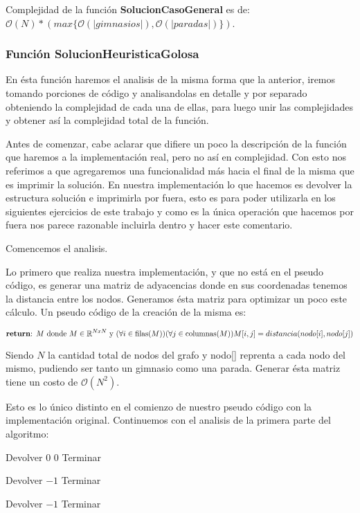 Complejidad de la función \textbf{SolucionCasoGeneral} es de: $\mathcal{O}(N) * (max\{\mathcal{O}(|gimnasios|), \mathcal{O}(|paradas|)\})$.


\subsubsection{Función SolucionHeuristicaGolosa}


En ésta función haremos el analisis de la misma forma que la anterior, iremos tomando porciones de código y analisandolas en detalle y por separado obteniendo la complejidad de cada una de ellas, para luego unir las complejidades y obtener así la complejidad total de la función.

Antes de comenzar, cabe aclarar que difiere un poco la descripción de la función que haremos a la implementación real, pero no así en complejidad. Con esto nos referimos a que agregaremos una funcionalidad más hacia el final de la misma que es imprimir la solución. En nuestra implementación lo que hacemos es devolver la estructura solución e imprimirla por fuera, esto es para poder utilizarla en los siguientes ejercicios de este trabajo y como es la única operación que hacemos por fuera nos parece razonable incluirla dentro y hacer este comentario.

Comencemos el analisis.

Lo primero que realiza nuestra implementación, y que no está en el pseudo código, es generar una matriz de adyacencias donde en sus coordenadas tenemos la distancia entre los nodos. Generamos ésta matriz para optimizar un poco este cálculo. Un pseudo código de la creación de la misma es:

\[
	\text{\textbf{return}:  } M \text{ donde } M \in \mathbb{R}^{NxN} \text{ y } (\forall i \in \text{filas($M$)})(\forall j \in \text{columnas($M$)}) M[i,j] = distancia(nodo[i], nodo[j])
\]

Siendo $N$ la cantidad total de nodos del grafo y nodo[] reprenta a cada nodo del mismo, pudiendo ser tanto un gimnasio como una parada. Generar ésta matriz tiene un costo de $\mathcal{O}(N^2)$.

Esto es lo único distinto en el comienzo de nuestro pseudo código con la implementación original. Continuemos con el analisis de la primera parte del algoritmo:

\begin{algorithm}[H]
\label{}
\begin{algorithmic}[]

	\State Devolver $0$ $0$
	\State Terminar
\EndIf

	\State Devolver $-1$
	\State Terminar
\EndIf

	\State Devolver $-1$
	\State Terminar
\EndIf

\medskip
\Statex \underline{}
\end{algorithmic}
\end{algorithm}

